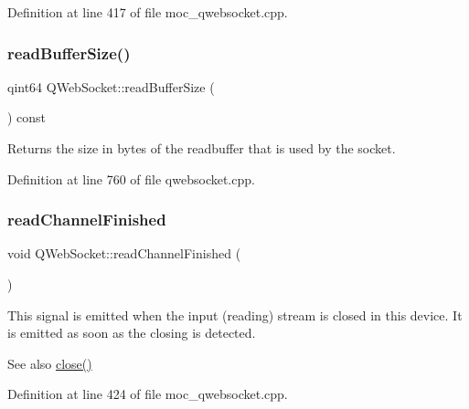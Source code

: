 Definition at line 417 of file moc\+\_\+qwebsocket.\+cpp.

\mbox{\label{class_q_web_socket_a3755970eca2be3d792ceb9c8e560ae32}} 
\subsubsection{\texorpdfstring{read\+Buffer\+Size()}{readBufferSize()}}
{\footnotesize\ttfamily qint64 Q\+Web\+Socket\+::read\+Buffer\+Size (\begin{DoxyParamCaption}{ }\end{DoxyParamCaption}) const}

Returns the size in bytes of the readbuffer that is used by the socket. 

Definition at line 760 of file qwebsocket.\+cpp.

\mbox{\label{class_q_web_socket_a17d4ab6c6fe8017626fb079cee6518a6}} 
\subsubsection{\texorpdfstring{read\+Channel\+Finished}{readChannelFinished}}
{\footnotesize\ttfamily void Q\+Web\+Socket\+::read\+Channel\+Finished (\begin{DoxyParamCaption}{ }\end{DoxyParamCaption})\hspace{0.3cm}{\ttfamily [signal]}}

This signal is emitted when the input (reading) stream is closed in this device. It is emitted as soon as the closing is detected.

\begin{DoxySeeAlso}{See also}
\mbox{\hyperlink{class_q_web_socket_ae1c9af16e7f53666ccd423864b8e2c35}{close()}} 
\end{DoxySeeAlso}


Definition at line 424 of file moc\+\_\+qwebsocket.\+cpp.

\mbox{\label{class_q_web_socket_a17b0d131ad2e4a0140f5faf23d30335c}} 
